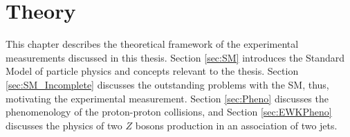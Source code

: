 \part{\LARGE{Theory}}
\label{sec:theory}

This chapter describes the theoretical framework of the experimental measurements discussed in this thesis. Section  \ref{sec:SM} introduces the Standard Model of particle physics and concepts relevant to the thesis. Section \ref{sec:SM_Incomplete} discusses the outstanding problems with the SM, thus, motivating the experimental measurement. Section \ref{sec:Pheno} discusses the phenomenology of the proton-proton collisions, and Section \ref{sec:EWKPheno} discusses the physics of two $Z$ bosons production in an association of two jets. 